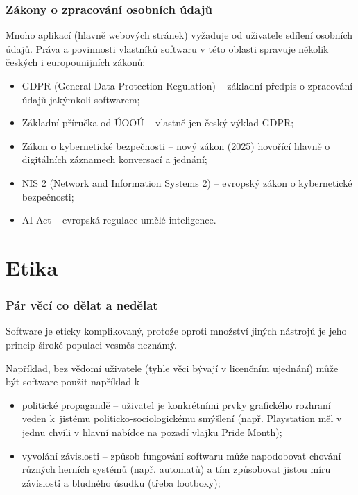\documentclass[aspectratio=169,11pt,svgnames,handout]{beamer}
\begin{document}
\begin{frame}
\frametitle{Zákony o zpracování osobních údajů}
Mnoho aplikací (hlavně webových stránek) vyžaduje od uživatele sdílení
osobních údajů. Práva a povinnosti vlastníků softwaru v této oblasti spravuje
několik českých i europounijních zákonů:
\begin{itemize}[label=\textbullet]
  \item \alert{GDPR} (General Data Protection Regulation) -- základní předpis
    o zpracování údajů jakýmkoli softwarem;
    \pause
  \item \alert{Základní příručka od ÚOOÚ} -- vlastně jen český výklad GDPR;
    \pause
  \item \alert{Zákon o kybernetické bezpečnosti} -- nový zákon (2025) hovořící
    hlavně o digitálních záznamech konversací a jednání;
    \pause
  \item \alert{NIS 2} (Network and Information Systems 2) -- evropský zákon o
    kybernetické bezpečnosti;
    \pause
  \item \alert{AI Act} -- evropská regulace umělé inteligence.
\end{itemize}
\end{frame}

\section{Etika}
\label{sec:etika}

\begin{frame}
\frametitle{Pár věcí co dělat a nedělat}
Software je eticky komplikovaný, protože oproti množství jiných nástrojů je
jeho princip široké populaci vesměs neznámý.

\pause
Například, bez vědomí uživatele (tyhle věci bývají  v licenčním
ujednání) může být software použit například k
\begin{itemize}[label=\textbullet]
  \item \alert{politické propagandě} -- uživatel je konkrétními prvky
    grafického rozhraní veden k~jistému politicko-sociologickému smýšlení (např.
      Playstation měl v jednu chvíli v hlavní nabídce na pozadí vlajku Pride
    Month);
    \pause
  \item \alert{vyvolání závislosti} -- způsob fungování softwaru může
    napodobovat chování různých herních systémů (např. automatů) a tím
    způsobovat jistou míru závislosti a bludného úsudku (třeba lootboxy);
\end{itemize}
\end{frame}
\end{document}
